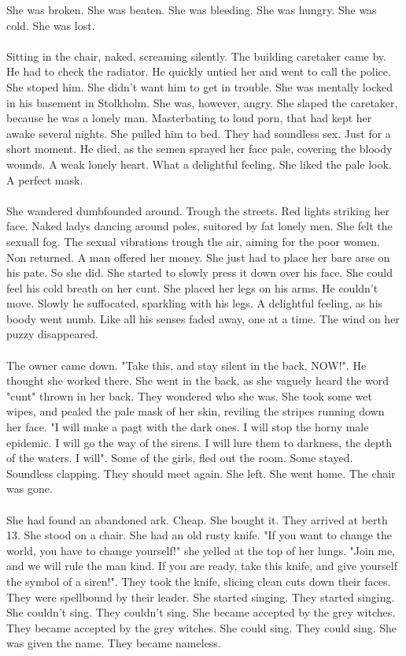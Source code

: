 \documentclass[]{article}
\begin{document}
She was broken. She was beaten. She was bleeding. She was hungry. She was cold. She was lost.
\\ \\
Sitting in the chair, naked, screaming silently. The building caretaker came by. He had to check the radiator. He quickly untied her and went to call the police. She stoped him. She didn't want him to get in trouble. She was mentally locked in his basement in Stolkholm. She was, however, angry. She slaped the caretaker, because he was a lonely man. Masterbating to loud porn, that had kept her awake several nights. She pulled him to bed. They had soundless sex. Just for a short moment. He died, as the semen sprayed her face pale, covering the bloody wounds. A weak lonely heart. What a delightful feeling. She liked the pale look. A perfect mask.
\\ \\
She wandered dumbfounded around. Trough the streets. Red lights striking her face. Naked ladys dancing around poles, suitored by fat lonely men. She felt the sexuall fog. The sexual vibrations trough the air, aiming for the poor women. Non returned. A man offered her money. She just had to place her bare arse on his pate. So she did. She started to slowly press it down over his face. She could feel his cold breath on her cunt. She placed her legs on his arms. He couldn't move. Slowly he suffocated, sparkling with his legs. A delightful feeling, as his boody went numb. Like all his senses faded away, one at a time. The wind on her puzzy disappeared. 
\\ \\
The owner came down. "Take this, and stay silent in the back, NOW!". He thought she worked there. She went in the back, as she vaguely heard the word "cunt" thrown in her back. They wondered who she was. She took some wet wipes, and pealed the pale mask of her skin, reviling the stripes running down her face. "I will make a pagt with the dark ones. I will stop the horny male epidemic. I will go the way of the sirens. I will lure them to darkness, the depth of the waters. I will". Some of the girls, fled out the room. Some stayed. Soundless clapping. They should meet again. She left. She went home. The chair was gone.
\\ \\
She had found an abandoned ark. Cheap. She bought it. They arrived at berth 13. She stood on a chair. She had an old rusty knife. "If you want to change the world, you have to change yourself!" she yelled at the top of her lungs. "Join me, and we will rule the man kind. If you are ready, take this knife, and give yourself the symbol of a siren!". They took the knife, slicing clean cuts down their faces. They were spellbound by their leader. She started singing. They started singing. She couldn't sing. They couldn't sing. She became accepted by the grey witches. They became accepted by the grey witches. She could sing. They could sing. She was given the name. They became nameless.
\end{document}
